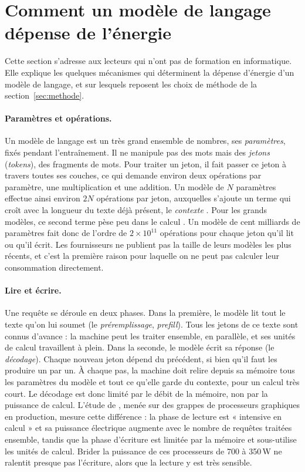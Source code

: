 \documentclass[11pt,a4paper]{article}
\begin{document}
\section{Comment un modèle de langage dépense de l'énergie}\label{sec:mecanique}

Cette section s'adresse aux lecteurs qui n'ont pas de formation en informatique. Elle explique les quelques mécanismes qui déterminent la dépense d'énergie d'un modèle de langage, et sur lesquels reposent les choix de méthode de la section~\ref{sec:methode}.

\paragraph{Paramètres et opérations.} Un modèle de langage est un très grand ensemble de nombres, ses \emph{paramètres}, fixés pendant l'entraînement. Il ne manipule pas des mots mais des \emph{jetons} (\emph{tokens}), des fragments de mots. Pour traiter un jeton, il fait passer ce jeton à travers toutes ses couches, ce qui demande environ deux opérations par paramètre, une multiplication et une addition. Un modèle de $N$ paramètres effectue ainsi environ $2N$ opérations par jeton, auxquelles s'ajoute un terme qui croît avec la longueur du texte déjà présent, le \emph{contexte} \citep[éq.~2.2]{kaplan2020}. Pour les grands modèles, ce second terme pèse peu dans le calcul \citep{pope2023}. Un modèle de cent milliards de paramètres fait donc de l'ordre de $2\times10^{11}$ opérations pour chaque jeton qu'il lit ou qu'il écrit. Les fournisseurs ne publient pas la taille de leurs modèles les plus récents, et c'est la première raison pour laquelle on ne peut pas calculer leur consommation directement.

\paragraph{Lire et écrire.} Une requête se déroule en deux phases. Dans la première, le modèle lit tout le texte qu'on lui soumet (le \emph{préremplissage}, \emph{prefill}). Tous les jetons de ce texte sont connus d'avance : la machine peut les traiter ensemble, en parallèle, et ses unités de calcul travaillent à plein. Dans la seconde, le modèle écrit sa réponse (le \emph{décodage}). Chaque nouveau jeton dépend du précédent, si bien qu'il faut les produire un par un. À chaque pas, la machine doit relire depuis sa mémoire tous les paramètres du modèle et tout ce qu'elle garde du contexte, pour un calcul très court. Le décodage est donc limité par le débit de la mémoire, non par la puissance de calcul. L'étude de \citet{patel2024}, menée sur des grappes de processeurs graphiques en production, mesure cette différence : la phase de lecture est « intensive en calcul » et sa puissance électrique augmente avec le nombre de requêtes traitées ensemble, tandis que la phase d'écriture est limitée par la mémoire et sous-utilise les unités de calcul. Brider la puissance de ces processeurs de 700 à 350\,W ne ralentit presque pas l'écriture, alors que la lecture y est très sensible.
\end{document}
